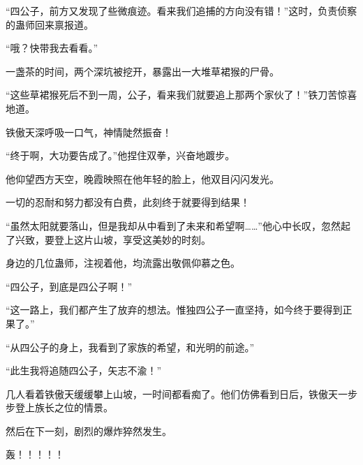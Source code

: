 \begin{this_body}
“四公子，前方又发现了些微痕迹。看来我们追捕的方向没有错！”这时，负责侦察的蛊师回来禀报道。

“哦？快带我去看看。”

一盏茶的时间，两个深坑被挖开，暴露出一大堆草裙猴的尸骨。

“这些草裙猴死后不到一周，公子，看来我们就要追上那两个家伙了！”铁刀苦惊喜地道。

铁傲天深呼吸一口气，神情陡然振奋！

“终于啊，大功要告成了。”他捏住双拳，兴奋地踱步。

他仰望西方天空，晚霞映照在他年轻的脸上，他双目闪闪发光。

一切的忍耐和努力都没有白费，此刻终于就要得到结果！

“虽然太阳就要落山，但是我却从中看到了未来和希望啊……”他心中长叹，忽然起了兴致，要登上这片山坡，享受这美妙的时刻。

身边的几位蛊师，注视着他，均流露出敬佩仰慕之色。

“四公子，到底是四公子啊！”

“这一路上，我们都产生了放弃的想法。惟独四公子一直坚持，如今终于要得到正果了。”

“从四公子的身上，我看到了家族的希望，和光明的前途。”

“此生我将追随四公子，矢志不渝！”

几人看着铁傲天缓缓攀上山坡，一时间都看痴了。他们仿佛看到日后，铁傲天一步步登上族长之位的情景。

然后在下一刻，剧烈的爆炸猝然发生。

轰！！！！！

\end{this_body}

